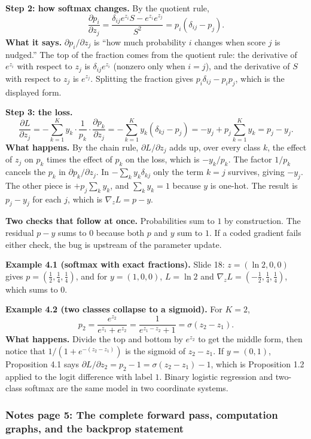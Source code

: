 \textbf{Step 2: how softmax changes.} By the quotient rule,
\[
\frac{\partial p_i}{\partial z_j}=\frac{\delta_{ij}e^{z_i}S-e^{z_i}e^{z_j}}{S^2}=p_i(\delta_{ij}-p_j).
\]
\textbf{What it says.} $\partial p_i/\partial z_j$ is ``how much probability $i$ changes when score $j$ is nudged.'' The top of the fraction comes from the quotient rule: the derivative of $e^{z_i}$ with respect to $z_j$ is $\delta_{ij}e^{z_i}$ (nonzero only when $i=j$), and the derivative of $S$ with respect to $z_j$ is $e^{z_j}$. Splitting the fraction gives $p_i\delta_{ij}-p_ip_j$, which is the displayed form.

\textbf{Step 3: the loss.}
\[
\frac{\partial L}{\partial z_j}=-\sum_{k=1}^{K}y_k\cdot\frac1{p_k}\cdot\frac{\partial p_k}{\partial z_j}
=-\sum_{k=1}^{K}y_k(\delta_{kj}-p_j)
=-y_j+p_j\sum_{k=1}^{K}y_k=p_j-y_j .
\]
\textbf{What happens.} By the chain rule, $\partial L/\partial z_j$ adds up, over every class $k$, the effect of $z_j$ on $p_k$ times the effect of $p_k$ on the loss, which is $-y_k/p_k$. The factor $1/p_k$ cancels the $p_k$ in $\partial p_k/\partial z_j$. In $-\sum_ky_k\delta_{kj}$ only the term $k=j$ survives, giving $-y_j$. The other piece is $+p_j\sum_ky_k$, and $\sum_ky_k=1$ because $y$ is one-hot. The result is $p_j-y_j$ for each $j$, which is $\nabla_zL=p-y$.

\textbf{Two checks that follow at once.} Probabilities sum to $1$ by construction. The residual $p-y$ sums to $0$ because both $p$ and $y$ sum to $1$. If a coded gradient fails either check, the bug is upstream of the parameter update.

\textbf{Example 4.1 (softmax with exact fractions).} Slide 18: $z=(\ln2,0,0)$ gives $p=(\tfrac12,\tfrac14,\tfrac14)$, and for $y=(1,0,0)$, $L=\ln2$ and $\nabla_zL=(-\tfrac12,\tfrac14,\tfrac14)$, which sums to $0$.

\textbf{Example 4.2 (two classes collapse to a sigmoid).} For $K=2$,
\[
p_2=\frac{e^{z_2}}{e^{z_1}+e^{z_2}}=\frac{1}{e^{z_1-z_2}+1}=\sigma(z_2-z_1).
\]
\textbf{What happens.} Divide the top and bottom by $e^{z_2}$ to get the middle form, then notice that $1/(1+e^{-(z_2-z_1)})$ is the sigmoid of $z_2-z_1$. If $y=(0,1)$, Proposition 4.1 says $\partial L/\partial z_2=p_2-1=\sigma(z_2-z_1)-1$, which is Proposition 1.2 applied to the logit difference with label $1$. Binary logistic regression and two-class softmax are the same model in two coordinate systems.

\subsubsection{Notes page 5: The complete forward pass, computation graphs, and the backprop statement}

